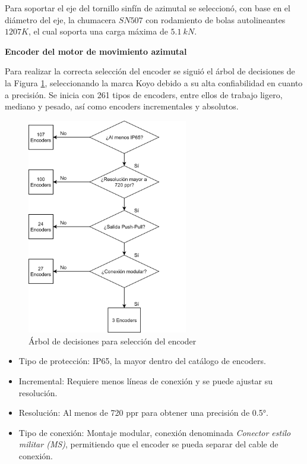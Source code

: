 Para soportar el eje del tornillo sinfín de azimutal se seleccionó, con base en el diámetro del eje, la chumacera $ SN 507 $ con rodamiento de bolas autolineantes $ 1207 K $, el cual soporta una carga máxima de $ 5.1\ kN $.

\textbf{Encoder del motor de movimiento azimutal}

Para realizar la correcta selección del encoder se siguió el árbol de decisiones de la Figura \ref{fig:encoder1}, seleccionando la marca Koyo debido a su alta confiabilidad en cuanto a precisión. Se inicia con 261 tipos de encoders, entre ellos de trabajo ligero, mediano y pesado, así como encoders incrementales y absolutos.

\begin{figure}[H]
	\centering
	\includegraphics[width=7cm]{imagenes/encoder1}
	\caption{Árbol de decisiones para selección del encoder}
	\label{fig:encoder1}
\end{figure}

\newpage
\begin{itemize}
	\item Tipo de protección: IP65, la mayor dentro del catálogo de encoders.
	\item Incremental: Requiere menos líneas de conexión y se puede ajustar su resolución.
	\item Resolución: Al menos de 720 ppr para obtener una precisión de 0.5°.
	\item Tipo de conexión: Montaje modular, conexión denominada \textit{Conector estilo militar (MS)}, permitiendo que el encoder se pueda separar del cable de conexión.
\end{itemize}

